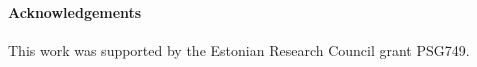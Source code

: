 \documentclass[submission,copyright,creativecommons]{eptcs}
\theoremstyle{definition}
\begin{document}
\paragraph{Acknowledgements}
This work was supported by the Estonian Research Council grant PSG749.

  
  
\end{document}
